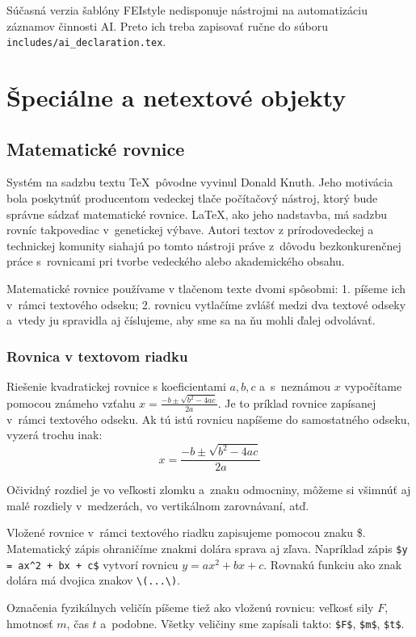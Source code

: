 Súčasná verzia šablóny FEIstyle nedisponuje nástrojmi na
automatizáciu záznamov činnosti AI.
Preto ich treba zapisovať ručne do súboru
\verb|includes/ai_declaration.tex|.

\section{Špeciálne a netextové objekty}
\subsection{Matematické rovnice}
Systém na sadzbu textu \TeX\ pôvodne vyvinul Donald Knuth.
Jeho motivácia bola poskytnúť producentom vedeckej tlače
počítačový nástroj,
ktorý bude správne sádzať matematické rovnice.
\LaTeX, ako jeho nadstavba, má sadzbu rovníc takpovediac
v~genetickej výbave.
Autori textov z prírodovedeckej a technickej komunity siahajú po tomto nástroji
práve z~dôvodu bezkonkurenčnej práce s~rovnicami pri tvorbe
vedeckého alebo akademického obsahu.

Matematické rovnice používame v tlačenom texte dvomi spôsobmi:
1. píšeme ich v~rámci textového odseku;
2. rovnicu vytlačíme zvlášť medzi dva textové odseky
a~vtedy ju spravidla aj číslujeme, aby sme sa na ňu mohli
ďalej odvolávať.

\subsubsection{Rovnica v textovom riadku}
Riešenie kvadratickej rovnice s koeficientami $a,b,c$
a~s~neznámou $x$ vypočítame pomocou známeho vzťahu
$x=\frac{-b\pm\sqrt{b^2-4ac}}{2a}$.
Je to príklad rovnice zapísanej v~rámci textového odseku.
Ak tú istú rovnicu napíšeme do samostatného odseku,
vyzerá trochu inak:
$$
  x=\frac{-b\pm\sqrt{b^2-4ac}}{2a}
$$

Očividný rozdiel je vo veľkosti zlomku a~znaku odmocniny,
môžeme si všimnúť aj malé rozdiely v~medzerách,
vo vertikálnom zarovnávaní, atď.

Vložené rovnice v~rámci textového riadku zapisujeme pomocou
znaku \$.
Matematický zápis ohraničíme znakmi dolára sprava aj zľava.
Napríklad zápis \verb|$y = ax^2 + bx + c$| vytvorí rovnicu $y = ax^2 + bx + c$. Rovnakú funkciu ako znak dolára má dvojica znakov \verb|\(...\)|.

Označenia fyzikálnych veličín píšeme tiež ako vloženú rovnicu:
veľkosť sily $F$, hmotnosť $m$, čas $t$ a~podobne.
Všetky veličiny sme zapísali takto: \verb|$F$|,
\verb|$m$|, \verb|$t$|.

